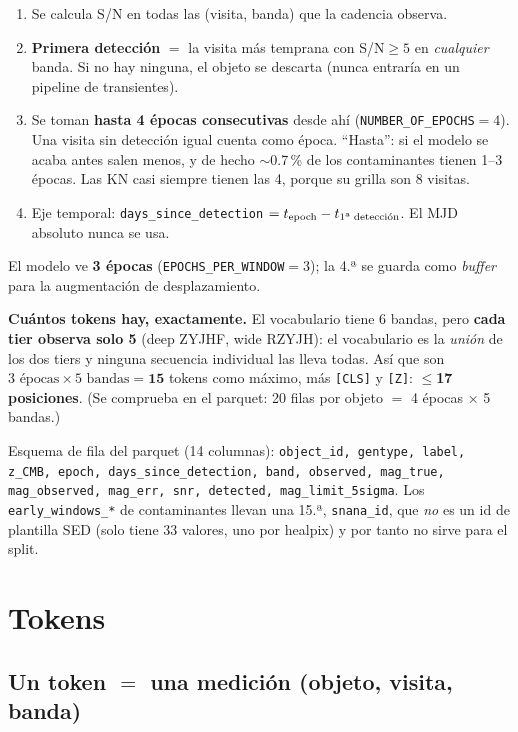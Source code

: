 \documentclass[11pt,a4paper]{article}
\newcommand{\code}[1]{\texttt{\small #1}}
\newlength{\examenpad}
\newenvironment{examen}
  {\par\medskip\noindent
   \begin{lrbox}{\examenbox}%
   \begin{minipage}{\dimexpr\linewidth-2\examenpad}\small}
  {\end{minipage}%
   \end{lrbox}%
   {\setlength{\fboxsep}{\examenpad}\colorbox{boxgray}{\usebox{\examenbox}}}%
   \par\medskip}
\begin{document}
\begin{enumerate}[nosep]
  \item Se calcula S/N en todas las (visita, banda) que la cadencia observa.
  \item \textbf{Primera detección} $=$ la visita más temprana con S/N$\ge5$ en \emph{cualquier}
        banda. Si no hay ninguna, el objeto se descarta (nunca entraría en un pipeline de
        transientes).
  \item Se toman \textbf{hasta 4 épocas consecutivas} desde ahí (\code{NUMBER\_OF\_EPOCHS}$=4$). Una
        visita sin detección igual cuenta como época. ``Hasta'': si el modelo se acaba antes salen
        menos, y de hecho $\sim$0.7\,\% de los contaminantes tienen 1--3 épocas. Las KN casi siempre
        tienen las 4, porque su grilla son 8 visitas.
  \item Eje temporal: \code{days\_since\_detection} $= t_{\rm epoch} - t_{\text{1ª detección}}$. El
        MJD absoluto nunca se usa.
\end{enumerate}

El modelo ve \textbf{3 épocas} (\code{EPOCHS\_PER\_WINDOW}$=3$); la 4.ª se guarda como \emph{buffer}
para la augmentación de desplazamiento.

\begin{examen}
\textbf{Cuántos tokens hay, exactamente.} El vocabulario tiene 6 bandas, pero \textbf{cada tier
observa solo 5} (deep ZYJHF, wide RZYJH): el vocabulario es la \emph{unión} de los dos tiers y
ninguna secuencia individual las lleva todas. Así que son
$3 \text{ épocas} \times 5 \text{ bandas} = \mathbf{15}$ tokens como máximo, más \code{[CLS]} y
\code{[Z]}: \textbf{$\le$17 posiciones}. (Se comprueba en el parquet: 20 filas por objeto
$=$ 4 épocas $\times$ 5 bandas.)
\end{examen}

Esquema de fila del parquet (14 columnas): \code{object\_id, gentype, label, z\_CMB, epoch,
days\_since\_detection, band, observed, mag\_true, mag\_observed, mag\_err, snr, detected,
mag\_limit\_5sigma}. Los \code{early\_windows\_*} de contaminantes llevan una 15.ª,
\code{snana\_id}, que \emph{no} es un id de plantilla SED (solo tiene 33 valores, uno por healpix)
y por tanto no sirve para el split.

\section{Tokens}

\subsection{Un token $=$ una medición (objeto, visita, banda)}
\end{document}
